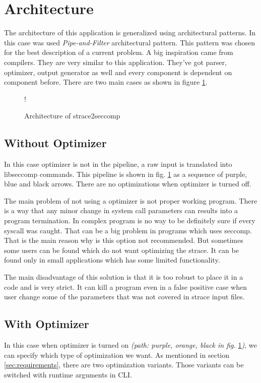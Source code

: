 \section{Architecture}
The architecture of this application is generalized using architectural patterns.
In this case was used \textit{Pipe-and-Filter}\cite{PipeAndFilter} architectural pattern.
This pattern was chosen for the best description of a current problem.
A big inspiration came from compilers.
They are very similar to this application.
They've got parser, optimizer, output generator as well and every component is dependent on component before.
There are two main cases as shown in figure \ref{fig:tikz:architecture}.

\begin{figure}[h]
  \centering
  \resizebox {\textwidth} {!} {
    
  }
  \caption{Architecture of strace2seccomp}
  \label{fig:tikz:architecture}
\end{figure}

\subsection{Without Optimizer}
In this case optimizer is not in the pipeline, a raw input is translated into libseccomp commands.
This pipeline is shown in fig. \ref{fig:tikz:architecture} as a sequence of purple, blue and black arrows.
There are no optimizations when optimizer is turned off.

The main problem of not using a optimizer is not proper working program.
There is a way that any minor change in system call parameters can results into a program termination.
In complex program is no way to be definitely sure if every syscall was caught.
That can be a big problem in programs which uses seccomp.
That is the main reason why is this option not recommended.
But sometimes some users can be found which do not want optimizing the strace.
It can be found only in small applications which has some limited functionality.

The main disadvantage of this solution is that it is too robust to place it in a code and is very strict.
It can kill a program even in a false positive case when user change some of the parameters that was not covered in strace input files.

\subsection{With Optimizer}
In this case when optimizer is turned on \textit{(path: purple, orange, black in fig.} \ref{fig:tikz:architecture}\textit{)}, we can specify which type of optimization we want.
As mentioned in section \ref{sec:requirements}, there are two optimization variants.
Those variants can be switched with runtime arguments in CLI.

